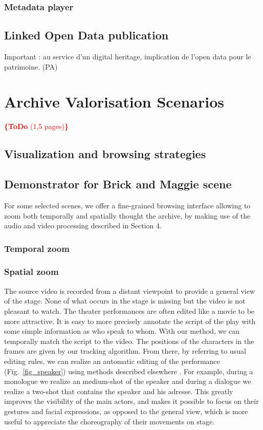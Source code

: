\documentclass[conference]{IEEEtran}
\newcommand{\todo}[1]{\noindent\textcolor{red}{{\bf \{ToDo} #1{\bf \}}}}
\begin{document}
\subsubsection{Metadata player}

\subsection{Linked Open Data  publication}
Important : au service d'un digital heritage, implication de l'open data pour le patrimoine. (PA)



\section{Archive Valorisation Scenarios}
\todo{(1,5 pages)}

\subsection{Visualization and browsing strategies}


\subsection{Demonstrator for Brick and Maggie scene}
For some selected scenes, we offer a fine-grained browsing interface allowing to zoom both temporally and spatially
thought the archive, by making use of the audio and video processing described in Section 4.  

\subsubsection{Temporal zoom}

\subsubsection{Spatial zoom}
The source video  is recorded from a distant viewpoint  to provide  a general  view of the stage.  None of what occurs in the stage is missing but the video is not pleasant to watch.  The theater performances are often edited like a movie to be more attractive.   It is easy to more precisely annotate the script of the play with some simple information as who speak to whom. With our method, we can temporally match the script to the video.  The positions of the characters in the frames are given by our tracking algorithm.  From there, by referring to usual editing rules, we can realize an automatic editing of the performance (Fig.~\ref{fig_speaker}) using methods described elsewhere \cite{Gandhi14}.  For example, during a monologue we realize an medium-shot of the speaker and during a dialogue we realize a two-shot that contains the speaker and his adresse. This greatly improves the visibility of the main actors, and makes it possible to focus on their gestures and facial expressions, as opposed to the general view, which is more useful to appreciate the choreography of their movements on stage.
\end{document}
